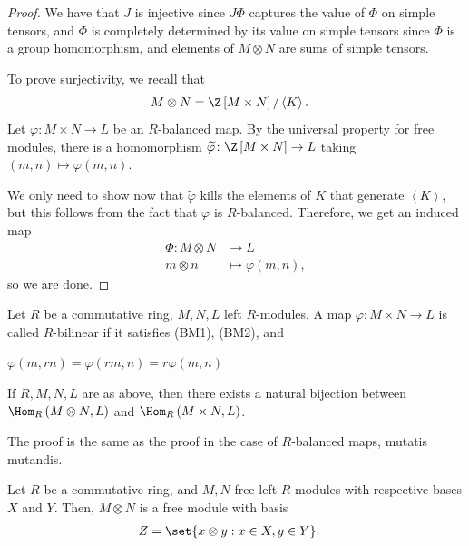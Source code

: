 \documentclass[10pt]{mypackage}
\begin{document}
\begin{proof}
  We have that $J$ is injective since $J\Phi$ captures the value of $\Phi$ on simple tensors, and $\Phi$ is completely determined by its value on simple tensors since $\Phi$ is a group homomorphism, and elements of $M\otimes N$ are sums of simple tensors.

  To prove surjectivity, we recall that
  \begin{align*}
    M\otimes N &= \Z\left[ M\times N \right]/\left\langle K \right\rangle.
  \end{align*}
  Let $\varphi\colon M\times N\rightarrow L$ be an $R$-balanced map. By the universal property for free modules, there is a homomorphism $ \widetilde{\varphi}\colon \Z\left[ M\times N \right]\rightarrow L $ taking $\left( m,n \right)\mapsto \varphi\left( m,n \right)$.

  We only need to show now that $\widetilde{\varphi}$ kills the elements of $K$ that generate $\left\langle K \right\rangle$, but this follows from the fact that $\varphi$ is $R$-balanced. Therefore, we get an induced map
  \begin{align*}
    \Phi\colon M\otimes N&\rightarrow L\\
    m\otimes n &\mapsto \varphi\left( m,n \right),
  \end{align*}
  so we are done.
\end{proof}
\begin{definition}
	Let $R$ be a commutative ring, $M,N,L$ left $R$-modules. A map $\varphi\colon M\times N\rightarrow L$ is called $R$-bilinear if it satisfies (BM1), (BM2), and
	\begin{description}[font=\normalfont]
		\item[(BM3')] $\varphi \left( m,rn \right) = \varphi \left( rm, n  \right) = r \varphi \left( m,n \right)$
    \end{description}
\end{definition}
\begin{theorem}
    If $R,M,N,L$ are as above, then there exists a natural bijection between $\Hom_{R} \left( M\otimes N, L\right)$ and $\Hom_{R} \left( M\times N, L \right)$.
\end{theorem}
The proof is the same as the proof in the case of $R$-balanced maps, mutatis mutandis.
\begin{proposition}
	Let $R$ be a commutative ring, and $M,N$ free left $R$-modules with respective bases $X$ and $Y$. Then, $M\otimes N$ is a free module with basis
	\begin{align*}
		Z &= \set{x\otimes y : x\in X,y\in Y}.
	\end{align*}
\end{proposition}
\end{document}
